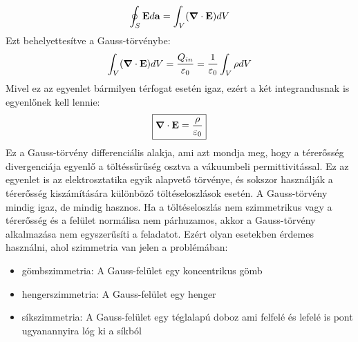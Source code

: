 \documentclass[a4paper,12pt]{article}
\begin{document}
\begin{equation}
    \oint_S \bold{E} d\bold{a} = \int_V (\boldsymbol{\nabla} \cdot \bold{E}) dV
\end{equation}
Ezt behelyettesítve a Gauss-törvénybe:
\begin{equation}
    \int_V (\boldsymbol{\nabla} \cdot \bold{E}) dV = \frac{{Q_{in}}}{\varepsilon_0} = \frac{1}{\varepsilon_0} \int_V \rho dV
\end{equation}
Mivel ez az egyenlet bármilyen térfogat esetén igaz, ezért a két integrandusnak is egyenlőnek kell lennie:
\begin{equation}
    \boxed{\boldsymbol{\nabla} \cdot \bold{E} = \frac{\rho}{\varepsilon_0}}
\end{equation}
Ez a Gauss-törvény differenciális alakja, ami azt mondja meg, hogy a térerősség divergenciája egyenlő a töltéssűrűség osztva a vákuumbeli permittivitással. Ez az egyenlet is az elektrosztatika egyik alapvető törvénye, és sokszor használják a térerősség kiszámítására különböző töltéseloszlások esetén.
\newline
\newline
A Gauss-törvény mindig igaz, de mindig hasznos. Ha a töltéseloszlás nem szimmetrikus vagy a térerősség és a felület normálisa nem párhuzamos, akkor a Gauss-törvény alkalmazása nem egyszerűsíti a feladatot. Ezért olyan esetekben érdemes használni, ahol szimmetria van jelen a problémában:
\begin{itemize}
    \item gömbszimmetria: A Gauss-felület egy koncentrikus gömb
    \item hengerszimmetria: A Gauss-felület egy henger
    \item síkszimmetria: A Gauss-felület egy téglalapú doboz ami felfelé és lefelé is pont ugyanannyira lóg ki a síkból
\end{itemize}
\end{document}
